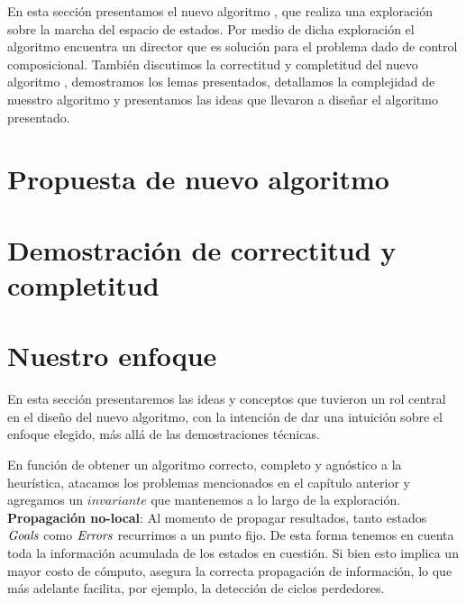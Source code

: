 
En esta sección presentamos el nuevo algoritmo \DCS, que realiza una exploración sobre la marcha del espacio de estados. Por medio de dicha exploración el algoritmo encuentra un director que es solución para el problema dado de control composicional. También discutimos la correctitud y completitud del nuevo algoritmo \DCS, demostramos los lemas presentados, detallamos la complejidad de nuesstro algoritmo y presentamos las ideas que llevaron a diseñar el algoritmo presentado. \\

\section{Propuesta de nuevo algoritmo}



\FloatBarrier

\section{Demostración de correctitud y completitud}


\section{Nuestro enfoque}\label{sct:enfoque}

En esta sección presentaremos las ideas y conceptos que tuvieron un rol central en el diseño del nuevo algoritmo, con la intención de dar una intuición sobre el enfoque elegido, más allá de las demostraciones técnicas.

En función de obtener un algoritmo correcto, completo y agnóstico a la heurística, atacamos los problemas mencionados en el capítulo anterior y agregamos un $invariante$ que mantenemos a lo largo de la exploración.\\

\textbf{Propagación no-local}: Al momento de propagar resultados, tanto estados $\mathit{Goals}$ como $\mathit{Errors}$ recurrimos a un punto fijo. De esta forma tenemos en cuenta toda la información acumulada de los estados en cuestión. Si bien esto implica un mayor costo de cómputo, asegura la correcta propagación de información, lo que más adelante facilita, por ejemplo, la detección de ciclos perdedores.\\

